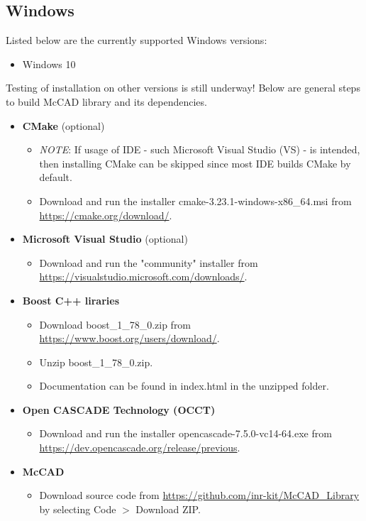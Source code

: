 \documentclass[letterpaper, 12 pt]{report}
\begin{document}
  \subsection{Windows}
    Listed below are the currently supported Windows versions:
    \begin{itemize}
  	  \item Windows 10
    \end{itemize} 
    Testing of installation on other versions is still underway! Below are general steps to build McCAD library and its dependencies.
    \begin{itemize}
	  \item \textbf{CMake} (optional)
 	  \begin{itemize}
    	\item \emph{NOTE}: If usage of IDE - such Microsoft Visual Studio (VS) - is intended, then installing CMake can be skipped since most IDE builds CMake by default.
 		\item Download and run the installer cmake-3.23.1-windows-x86\_64.msi from \url{https://cmake.org/download/}.
  	  \end{itemize}
	  \item \textbf{Microsoft Visual Studio} (optional)
	  \begin{itemize}
		\item Download and run the "community" installer from \url{https://visualstudio.microsoft.com/downloads/}.
	  \end{itemize}
      \item \textbf{Boost C++ liraries}
      \begin{itemize}
    	\item Download boost\_1\_78\_0.zip from \url{https://www.boost.org/users/download/}.
    	\item Unzip boost\_1\_78\_0.zip.
    	\item Documentation can be found in index.html in the unzipped folder.
      \end{itemize}
      \item \textbf{Open CASCADE Technology (OCCT)}
	  \begin{itemize}
		\item Download and run the installer opencascade-7.5.0-vc14-64.exe from \url{https://dev.opencascade.org/release/previous}.
	  \end{itemize}
	  \item \textbf{McCAD}
	  \begin{itemize}
		\item Download source code from \url{https://github.com/inr-kit/McCAD_Library} by selecting Code $>$ Download ZIP.

\end{itemize}
\end{itemize}
\end{document}
